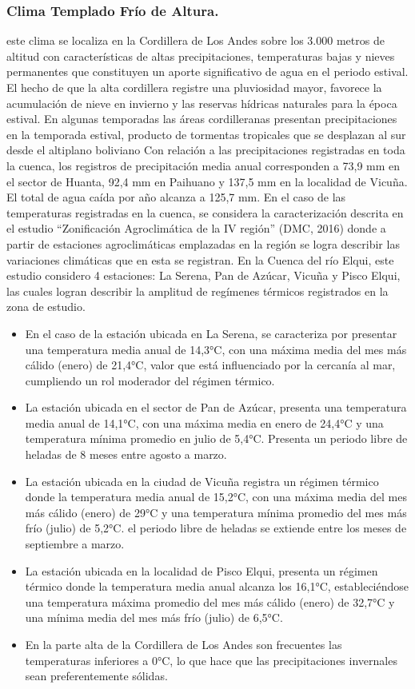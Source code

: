 \documentclass[10pt]{article}
\begin{document}
\subsubsection{Clima Templado Frío de Altura.}
este clima se localiza en la Cordillera de Los Andes sobre los 3.000 metros de altitud con características de altas precipitaciones, temperaturas bajas y nieves permanentes que constituyen un aporte significativo de agua en el periodo estival. El hecho de que la alta cordillera registre una pluviosidad mayor, favorece la acumulación de nieve en invierno y las reservas hídricas naturales para la época estival. En algunas temporadas las áreas cordilleranas presentan precipitaciones en la temporada estival, producto de tormentas tropicales que se desplazan al sur desde el altiplano boliviano
Con relación a las precipitaciones registradas en toda la cuenca, los registros de precipitación media anual corresponden a 73,9 mm en el sector de Huanta, 92,4 mm en Paihuano y 137,5 mm en la localidad de Vicuña. El total de agua caída por año alcanza a 125,7 mm. 
En el caso de las temperaturas registradas en la cuenca, se considera la caracterización descrita  en el estudio “Zonificación Agroclimática de la IV región” (DMC, 2016) donde a partir de estaciones agroclimáticas emplazadas en la región se logra describir las variaciones climáticas que en esta se registran. En la Cuenca del río Elqui, este estudio considero 4 estaciones: La Serena, Pan de Azúcar, Vicuña y Pisco Elqui, las cuales logran describir la amplitud de regímenes térmicos registrados en la zona de estudio. 

\begin{itemize}
\item En el caso de la estación ubicada en La Serena, se caracteriza por presentar una temperatura media anual de 14,3°C, con una máxima media del mes más cálido (enero) de 21,4°C, valor que está influenciado por la cercanía al mar, cumpliendo un rol moderador del régimen térmico. 
\item La estación ubicada en el sector de Pan de Azúcar, presenta una temperatura media anual de 14,1°C, con una máxima media en enero de 24,4°C y una temperatura mínima promedio en julio de 5,4°C. Presenta un periodo libre de heladas de 8 meses entre agosto a marzo. 
\item La estación ubicada en la ciudad de Vicuña registra un régimen térmico donde la temperatura media anual de 15,2°C, con una máxima media del mes más cálido (enero) de 29°C y una temperatura mínima promedio del mes más frío (julio) de 5,2°C. el periodo libre de heladas se extiende entre los meses de septiembre a marzo.
\item La estación ubicada en la localidad de Pisco Elqui, presenta un régimen térmico donde la temperatura media anual alcanza los 16,1°C, estableciéndose una temperatura máxima promedio del mes más cálido (enero) de 32,7°C y una mínima media del mes más frío (julio) de 6,5°C.
\item En la parte alta de la Cordillera de Los Andes son frecuentes las temperaturas inferiores a 0°C, lo que hace que las precipitaciones invernales sean preferentemente sólidas.
\end{itemize}
\end{document}
